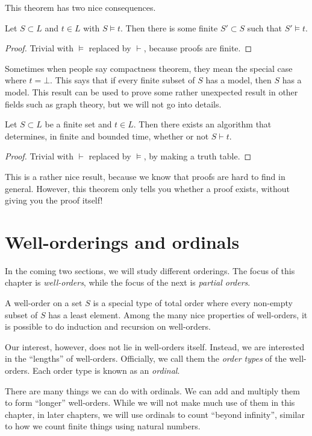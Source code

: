 \documentclass[a4paper]{article}
\begin{document}
This theorem has two nice consequences.
\begin{cor}
  Let $S\subset L$ and $t\in L$ with $S\models t$. Then there is some finite $S'\subset S$ such that $S'\models t$.
\end{cor}

\begin{proof}
  Trivial with $\models$ replaced by $\vdash$, because proofs are finite.
\end{proof}
Sometimes when people say compactness theorem, they mean the special case where $t = \bot$. This says that if every finite subset of $S$ has a model, then $S$ has a model. This result can be used to prove some rather unexpected result in other fields such as graph theory, but we will not go into details.

\begin{cor}
  Let $S\subset L$ be a finite set and $t\in L$. Then there exists an algorithm that determines, in finite and bounded time, whether or not $S\vdash t$.
\end{cor}
\begin{proof}
  Trivial with $\vdash$ replaced by $\models$, by making a truth table.
\end{proof}
This is a rather nice result, because we know that proofs are hard to find in general. However, this theorem only tells you whether a proof exists, without giving you the proof itself!

\section{Well-orderings and ordinals}
In the coming two sections, we will study different orderings. The focus of this chapter is \emph{well-orders}, while the focus of the next is \emph{partial orders}.

A well-order on a set $S$ is a special type of total order where every non-empty subset of $S$ has a least element. Among the many nice properties of well-orders, it is possible to do induction and recursion on well-orders.

Our interest, however, does not lie in well-orders itself. Instead, we are interested in the ``lengths'' of well-orders. Officially, we call them the \emph{order types} of the well-orders. Each order type is known as an \emph{ordinal}.

There are many things we can do with ordinals. We can add and multiply them to form ``longer'' well-orders. While we will not make much use of them in this chapter, in later chapters, we will use ordinals to count ``beyond infinity'', similar to how we count finite things using natural numbers.
\end{document}
